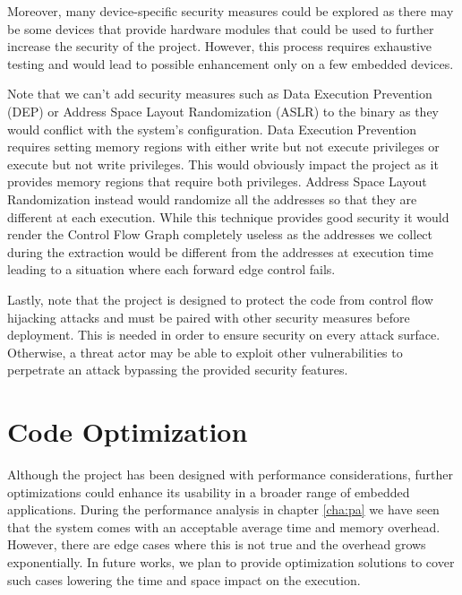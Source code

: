 Moreover, many device-specific security measures could be explored as there may
be some devices that provide hardware modules that could be used to further
increase the security of the project. However, this process requires exhaustive
testing and would lead to possible enhancement only on a few embedded devices.

Note that we can't add security measures such as Data Execution Prevention (DEP)
or Address Space Layout Randomization (ASLR) to the binary as they would
conflict with the system's configuration. Data Execution Prevention requires setting
memory regions with either write but not execute privileges or execute but not write
privileges. This would obviously impact the project as it provides memory
regions that require both privileges. Address Space Layout Randomization instead
would randomize all the addresses so that they are different at each execution.
While this technique provides good security it would render the Control Flow
Graph completely useless as the addresses we collect during the extraction would
be different from the addresses at execution time leading to a situation where
each forward edge control fails.

Lastly, note that the project is designed to protect the code from control flow hijacking
attacks and must be paired with other security measures before deployment. This
is needed in order to ensure security on every attack surface. Otherwise, a
threat actor may be able to exploit other vulnerabilities to perpetrate an
attack bypassing the provided security features.

\section{Code Optimization}
\label{sec:future_optimization}

Although the project has been designed with performance considerations, further
optimizations could enhance its usability in a broader range of embedded
applications. During the performance analysis in chapter \ref{cha:pa} we have seen
that the system comes with an acceptable average time and memory overhead.
However, there are edge cases where this is not true and the overhead grows exponentially.
In future works, we plan to provide optimization solutions to cover such cases lowering
the time and space impact on the execution.

